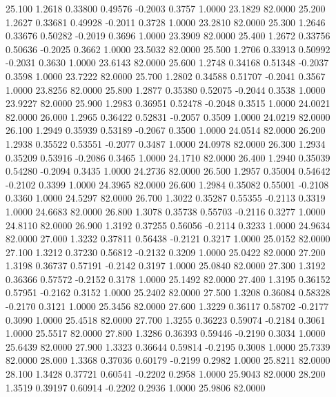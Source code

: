   25.100   1.2618   0.33800   0.49576  -0.2003   0.3757   1.0000  23.1829  82.0000
  25.200   1.2627   0.33681   0.49928  -0.2011   0.3728   1.0000  23.2810  82.0000
  25.300   1.2646   0.33676   0.50282  -0.2019   0.3696   1.0000  23.3909  82.0000
  25.400   1.2672   0.33756   0.50636  -0.2025   0.3662   1.0000  23.5032  82.0000
  25.500   1.2706   0.33913   0.50992  -0.2031   0.3630   1.0000  23.6143  82.0000
  25.600   1.2748   0.34168   0.51348  -0.2037   0.3598   1.0000  23.7222  82.0000
  25.700   1.2802   0.34588   0.51707  -0.2041   0.3567   1.0000  23.8256  82.0000
  25.800   1.2877   0.35380   0.52075  -0.2044   0.3538   1.0000  23.9227  82.0000
  25.900   1.2983   0.36951   0.52478  -0.2048   0.3515   1.0000  24.0021  82.0000
  26.000   1.2965   0.36422   0.52831  -0.2057   0.3509   1.0000  24.0219  82.0000
  26.100   1.2949   0.35939   0.53189  -0.2067   0.3500   1.0000  24.0514  82.0000
  26.200   1.2938   0.35522   0.53551  -0.2077   0.3487   1.0000  24.0978  82.0000
  26.300   1.2934   0.35209   0.53916  -0.2086   0.3465   1.0000  24.1710  82.0000
  26.400   1.2940   0.35039   0.54280  -0.2094   0.3435   1.0000  24.2736  82.0000
  26.500   1.2957   0.35004   0.54642  -0.2102   0.3399   1.0000  24.3965  82.0000
  26.600   1.2984   0.35082   0.55001  -0.2108   0.3360   1.0000  24.5297  82.0000
  26.700   1.3022   0.35287   0.55355  -0.2113   0.3319   1.0000  24.6683  82.0000
  26.800   1.3078   0.35738   0.55703  -0.2116   0.3277   1.0000  24.8110  82.0000
  26.900   1.3192   0.37255   0.56056  -0.2114   0.3233   1.0000  24.9634  82.0000
  27.000   1.3232   0.37811   0.56438  -0.2121   0.3217   1.0000  25.0152  82.0000
  27.100   1.3212   0.37230   0.56812  -0.2132   0.3209   1.0000  25.0422  82.0000
  27.200   1.3198   0.36737   0.57191  -0.2142   0.3197   1.0000  25.0840  82.0000
  27.300   1.3192   0.36366   0.57572  -0.2152   0.3178   1.0000  25.1492  82.0000
  27.400   1.3195   0.36152   0.57951  -0.2162   0.3152   1.0000  25.2402  82.0000
  27.500   1.3208   0.36084   0.58328  -0.2170   0.3121   1.0000  25.3456  82.0000
  27.600   1.3229   0.36117   0.58702  -0.2177   0.3090   1.0000  25.4518  82.0000
  27.700   1.3255   0.36223   0.59074  -0.2184   0.3061   1.0000  25.5517  82.0000
  27.800   1.3286   0.36393   0.59446  -0.2190   0.3034   1.0000  25.6439  82.0000
  27.900   1.3323   0.36644   0.59814  -0.2195   0.3008   1.0000  25.7339  82.0000
  28.000   1.3368   0.37036   0.60179  -0.2199   0.2982   1.0000  25.8211  82.0000
  28.100   1.3428   0.37721   0.60541  -0.2202   0.2958   1.0000  25.9043  82.0000
  28.200   1.3519   0.39197   0.60914  -0.2202   0.2936   1.0000  25.9806  82.0000
